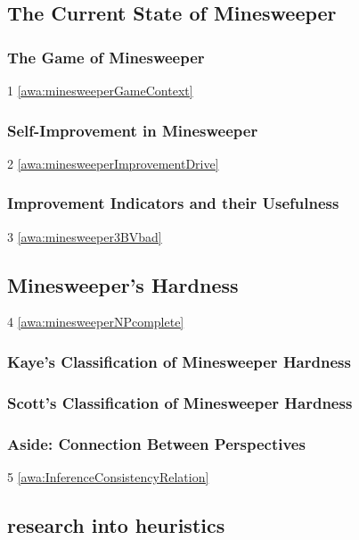     \subsection{The Current State of Minesweeper}
        \subsubsection{The Game of Minesweeper}
             1 \ref{awa:minesweeperGameContext}  \\
        \subsubsection{Self-Improvement in Minesweeper}
             2 \ref{awa:minesweeperImprovementDrive}  \\
        \subsubsection{Improvement Indicators and their Usefulness}
             3 \ref{awa:minesweeper3BVbad}  \\
             
    \subsection{Minesweeper's Hardness}
         4 \ref{awa:minesweeperNPcomplete}  \\
        \subsubsection{Kaye's Classification of Minesweeper Hardness}
        \subsubsection{Scott's Classification of Minesweeper Hardness}
        \subsubsection{Aside: Connection Between Perspectives}
             5 \ref{awa:InferenceConsistencyRelation}  \\

    \subsection{research into heuristics}
